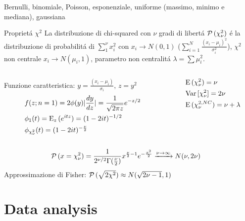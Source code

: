 \begin{frame}{Bernulli, binomiale, Poisson, esponenziale, uniforme (massimo, minimo e mediana), gaussiana}
\end{frame}

\begin{frame}{Propriet\'a $\chi^2$}
La distribuzione di chi-squared con $\nu$ gradi di libert\'a $\prob{(\chi_{\nu}^2)}$ \'e la distribuzione di probabilit\'a di $\sum_1^{\nu}x_i^2$ con $x_i\to N(0,1)$ ($\sum_{i=1}^N\frac{(x_i-\mu_i)^2}{\sigma_i^2}$), $\chi^2$ non centrale $x_i\to N(\mu_i,1)$, parametro non centralit\'a $\lambda=\sum\mu_i^2$.
\begin{columns}[T]
	\begin{column}{0.7\textwidth}
		Funzione caratteristica: $y=\frac{(x_i-\mu_i)}{\sigma_i}$, $z=y^2$
		\begin{align*}
		&f(z;n=1)=2\phi(y)|\TDy{z}{y}|=\frac{1}{\sqrt{2\pi z}}\exp{-z/2}\\
		&\phi_1(t)=\E_z{(\exp{itz})}=(1-2it)\expy{-1/2}\\
		&\phi_{\chi^2_{\nu}}(t)=(1-2it)\expy{-\frac{\nu}{2}}
		\end{align*}
	\end{column}
	\begin{column}{0.3\textwidth}
		\begin{align*}
		&\E{(\chi^2_{\nu})}=\nu\\
		&\var{[\chi_{\nu}^2]}=2\nu\\
		&\E{(\chi^{2,NC}_{\nu})}=\nu+\lambda
		\end{align*}
	\end{column}
\end{columns}
\begin{align*}
&\prob{(x=\chi^2_{\nu})}=\frac{1}{2\expy{\nu/2}\Gamma(\frac{\nu}{2})}x\expy{\frac{\nu}{2}-1}\exp{-\frac{x^2}{2}}\xrightarrow{\nu\to\infty}N(\nu,2\nu)
\end{align*}
Approssimazione di Fisher: $\prob{(\sqrt{2\chi^2})}\approx N(\sqrt{2\nu-1},1)$
\end{frame}

\section{Data analysis}

